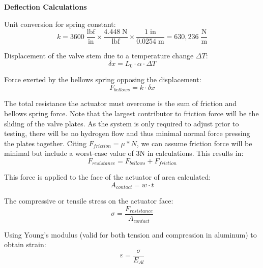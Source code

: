 \documentclass[12pt, letterpaper]{report}%
\begin{document}
\noindent\textbf{Deflection Calculations}

\vspace{1em}
Unit conversion for spring constant:
\begin{equation}
    k = 3600\;\frac{\text{lbf}}{\text{in}}
      \times \frac{4.448\;\text{N}}{\text{lbf}}
      \times \frac{1\;\text{in}}{0.0254\;\text{m}}
      = 630{,}236\;\frac{\text{N}}{\text{m}}
\end{equation}



Displacement of the valve stem due to a temperature change $\Delta T$:
\begin{equation}
    \delta x = L_0 \cdot \alpha \cdot \Delta T
\end{equation}

Force exerted by the bellows spring opposing the displacement:
\begin{equation}
    F_{bellows} = k \cdot \delta x
\end{equation}

The total resistance the actuator must overcome is the sum of friction and bellows spring force.
Note that the largest contributor to friction force will be the sliding of the valve plates. As
the system is only required to adjust prior to testing, there will be no hydrogen flow and thus minimal
normal force pressing the plates together. Citing $F_{friction} = \mu*N $, we can assume friction force
will be minimal but include a worst-case value of 3N in calculations. This results in:
\begin{equation}
    F_{resistance} = F_{bellows} + F_{friction}
\end{equation}

This force is applied to the face of the actuator of area calculated:
\begin{equation}
    A_{contact} = w \cdot t
\end{equation}

The compressive or tensile stress on the actuator face:
\begin{equation}
    \sigma = \frac{F_{resistance}}{A_{contact}}
\end{equation}

Using Young's modulus (valid for both tension and compression in aluminum) to obtain strain:
\begin{equation}
    \varepsilon = \frac{\sigma}{E_{Al}}
\end{equation}
\end{document}
